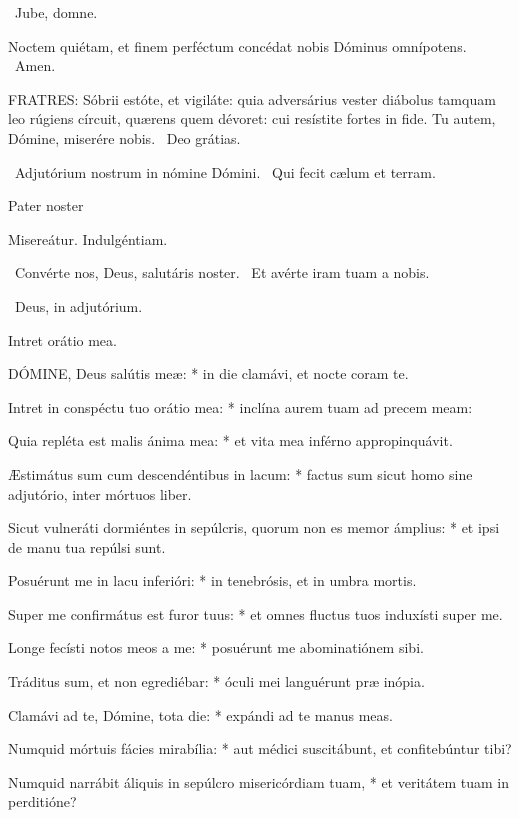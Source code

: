 
\V\ Jube, domne.

 Noctem quiétam, et finem perféctum concédat nobis Dóminus omnípotens. \R\ Amen.


\lettrine[lines=2]{F}{RATRES}: Sóbrii estóte, et vigiláte: quia adversárius vester diábolus tamquam leo rúgiens círcuit, quærens quem dévoret: cui resístite fortes in fide. Tu autem, Dómine, miserére nobis. \R\ Deo grátias.

\V\ Adjutórium nostrum in nómine Dómini. \R\ Qui fecit cælum et terram.

Pater noster 

 Misereátur. Indulgéntiam.

\V\ Convérte nos, Deus, salutáris noster. \R\ Et avérte iram tuam a nobis.

\V\ Deus, in adjutórium.

 Intret orátio mea.


\lettrine[lines=2]{D}{ÓMINE}, Deus salútis meæ: * in die clamávi, et nocte coram te.

Intret in conspéctu tuo orátio mea: * inclína aurem tuam ad precem meam:

Quia repléta est malis ánima mea: * et vita mea inférno appropinquávit.

Æstimátus sum cum descendéntibus in lacum: * factus sum sicut homo sine adjutório, inter mórtuos liber.

Sicut vulneráti dormiéntes in sepúlcris, quorum non es memor ámplius: * et ipsi de manu tua repúlsi sunt.

Posuérunt me in lacu inferióri: * in tenebrósis, et in umbra mortis.

Super me confirmátus est furor tuus: * et omnes fluctus tuos induxísti super me.

Longe fecísti notos meos a me: * posuérunt me abominatiónem sibi.

Tráditus sum, et non egrediébar: * óculi mei languérunt præ inópia.

Clamávi ad te, Dómine, tota die: * expándi ad te manus meas.

Numquid mórtuis fácies mirabília: * aut médici suscitábunt, et confitebúntur tibi?

Numquid narrábit áliquis in sepúlcro misericórdiam tuam, * et veritátem tuam in perditióne?

